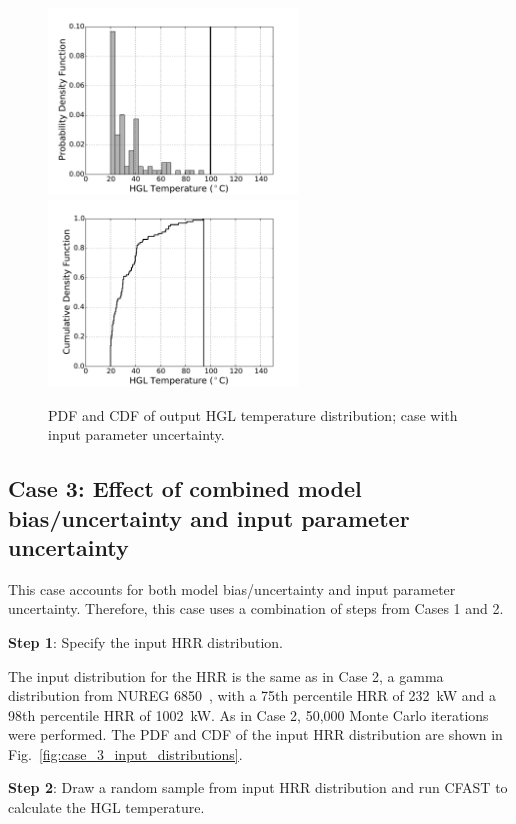 \documentclass[12pt]{article}
\begin{document}
\begin{figure}[p]
\includegraphics[width=2.6in]{Figures/output_PDF_2_input}
\includegraphics[width=2.6in]{Figures/output_CDF_2_input}
\caption{PDF and CDF of output HGL temperature distribution; case with input parameter uncertainty.}
\label{fig:case_2_output_distributions}
\end{figure}


\clearpage


\subsection{Case 3: Effect of combined model bias/uncertainty and input parameter uncertainty}

This case accounts for both model bias/uncertainty and input parameter uncertainty. Therefore, this case uses a combination of steps from Cases 1 and 2.

\textbf{Step 1}: Specify the input HRR distribution.

The input distribution for the HRR is the same as in Case 2, a gamma distribution from NUREG 6850~\cite{NUREG_6850}, with a 75th percentile HRR of 232~kW and a 98th percentile HRR of 1002~kW. As in Case 2, 50,000 Monte Carlo iterations were performed. The PDF and CDF of the input HRR distribution are shown in Fig.~\ref{fig:case_3_input_distributions}.

\textbf{Step 2}: Draw a random sample from input HRR distribution and run CFAST to calculate the HGL temperature.
\end{document}
